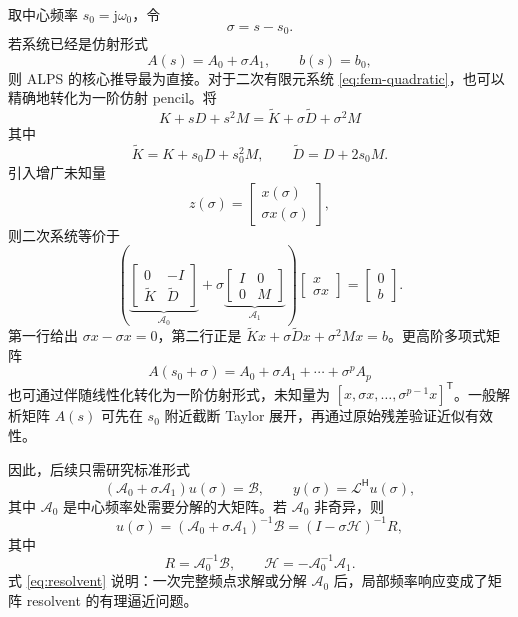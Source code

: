 \documentclass[UTF8,a4paper,11pt]{ctexart}
\newcommand{\jj}{\mathrm{j}}
\newcommand{\cA}{\mathcal{A}}
\newcommand{\cB}{\mathcal{B}}
\newcommand{\cH}{\mathcal{H}}
\newcommand{\cL}{\mathcal{L}}
\newcommand{\transpose}{\mathsf{T}}
\newcommand{\herm}{\mathsf{H}}
\begin{document}
取中心频率 $s_0=\jj\omega_0$，令
\[
    \sigma=s-s_0 .
\]
若系统已经是仿射形式
\begin{equation}
    A(s)=A_0+\sigma A_1,\qquad b(s)=b_0,
    \label{eq:affine-system}
\end{equation}
则 ALPS 的核心推导最为直接。对于二次有限元系统 \eqref{eq:fem-quadratic}，也可以精确地转化为一阶仿射 pencil。将
\[
    K+sD+s^2M
    =\widetilde K+\sigma\widetilde D+\sigma^2M
\]
其中
\[
    \widetilde K=K+s_0D+s_0^2M,\qquad
    \widetilde D=D+2s_0M .
\]
引入增广未知量
\[
    z(\sigma)=
    \begin{bmatrix}
        x(\sigma)\\
        \sigma x(\sigma)
    \end{bmatrix},
\]
则二次系统等价于
\begin{equation}
    \left(
    \underbrace{
    \begin{bmatrix}
        0&-I\\
        \widetilde K&\widetilde D
    \end{bmatrix}}_{\cA_0}
    +\sigma
    \underbrace{
    \begin{bmatrix}
        I&0\\
        0&M
    \end{bmatrix}}_{\cA_1}
    \right)
    \begin{bmatrix}
        x\\
        \sigma x
    \end{bmatrix}
    =
    \begin{bmatrix}
        0\\
        b
    \end{bmatrix}.
    \label{eq:quadratic-linearization}
\end{equation}
第一行给出 $\sigma x-\sigma x=0$，第二行正是
$\widetilde Kx+\sigma\widetilde D x+\sigma^2Mx=b$。更高阶多项式矩阵
\[
    A(s_0+\sigma)=A_0+\sigma A_1+\cdots+\sigma^pA_p
\]
也可通过伴随线性化转化为一阶仿射形式，未知量为
$[x,\sigma x,\ldots,\sigma^{p-1}x]^\transpose$。一般解析矩阵 $A(s)$ 可先在 $s_0$ 附近截断 Taylor 展开，再通过原始残差验证近似有效性。

因此，后续只需研究标准形式
\begin{equation}
    (\cA_0+\sigma\cA_1)u(\sigma)=\cB,
    \qquad
    y(\sigma)=\cL^{\herm}u(\sigma),
    \label{eq:standard-pencil}
\end{equation}
其中 $\cA_0$ 是中心频率处需要分解的大矩阵。若 $\cA_0$ 非奇异，则
\begin{equation}
    u(\sigma)
    =
    (\cA_0+\sigma\cA_1)^{-1}\cB
    =
    (I-\sigma\cH)^{-1}R,
    \label{eq:resolvent}
\end{equation}
其中
\begin{equation}
    R=\cA_0^{-1}\cB,\qquad
    \cH=-\cA_0^{-1}\cA_1 .
    \label{eq:H-R-definition}
\end{equation}
式 \eqref{eq:resolvent} 说明：一次完整频点求解或分解 $\cA_0$ 后，局部频率响应变成了矩阵 resolvent 的有理逼近问题。
\end{document}
